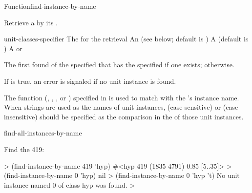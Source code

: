 \documentclass[10pt,twoside,english,pdftex]{article}
\begin{document}

\begin{functiondoc}{Function}{find-instance-by-name}{
    }
%
%
%

\fnsyntax

\fnpurpose Retrieve a  by its .

\fnpackage {}

\fnmodule {}

\fnargs
\begin{args}{unit-classes-specifier}
 The  for the retrieval
 An 
(see below; default is )
\arg[errorp] A  (default is \nil) 
 A  or \nil{}
\end{args}

\fnreturns The first  found of the specified
 that has the specified 
if one exists; \nil{} otherwise.

\fnerrors
If  is true, an error is signaled if no unit instance is found.

\fndsyntax
\W\supp\tabletop
\unitclassspec
\subclassingspec

\fndescription The  function
(, , , or )
specified in  is used to match
 with the 's instance name.
When strings are used as the names of unit instances, 
(case sensitive) or  (case insensitive) should be
specified as the comparison  in the  of
those unit instances.

\begin{alsos}{find-all-instances-by-name}
\end{alsos}

\fnexample
Find the   419:
%
\W\supp
\begin{example}
  > (find-instance-by-name 419 'hyp)
  #<hyp 419 (1835 4791) 0.85 [5..35]>
  > (find-instance-by-name 0 'hyp)
  nil
  > (find-instance-by-name 0 'hyp 't)
  No unit instance named 0 of class hyp was found.
  >
\end{example}


\end{functiondoc}
\end{document}
